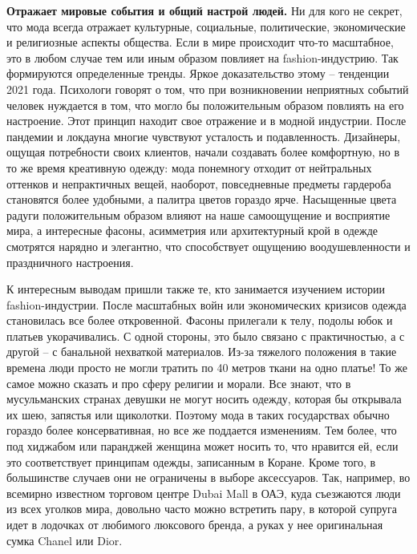 \textbf{Отражает мировые события и общий настрой людей.}
Ни для кого не секрет, что мода всегда отражает культурные, социальные, политические, экономические и религиозные аспекты общества. Если в мире происходит что-то масштабное, это в любом случае тем или иным образом повлияет на fashion-индустрию. Так формируются определенные тренды. Яркое доказательство этому – тенденции 2021 года. Психологи говорят о том, что при возникновении неприятных событий человек нуждается в том, что могло бы положительным образом повлиять на его настроение. Этот принцип находит свое отражение и в модной индустрии. После пандемии и локдауна многие чувствуют усталость и подавленность. Дизайнеры, ощущая потребности своих клиентов, начали создавать более комфортную, но в то же время креативную одежду: мода понемногу отходит от нейтральных оттенков и непрактичных вещей, наоборот, повседневные предметы гардероба становятся более удобными, а палитра цветов гораздо ярче. Насыщенные цвета радуги положительным образом влияют на наше самоощущение и восприятие мира, а интересные фасоны, асимметрия или архитектурный крой в одежде смотрятся нарядно и элегантно, что способствует ощущению воодушевленности и праздничного настроения.

К интересным выводам пришли также те, кто занимается изучением истории fashion-индустрии. После масштабных войн или экономических кризисов одежда становилась все более откровенной. Фасоны прилегали к телу, подолы юбок и платьев укорачивались. С одной стороны, это было связано с практичностью, а с другой – с банальной нехваткой материалов. Из-за тяжелого положения в такие времена люди просто не могли тратить по 40 метров ткани на одно платье!
То же самое можно сказать и про сферу религии и морали. Все знают, что в мусульманских странах девушки не могут носить одежду, которая бы открывала их шею, запястья или щиколотки. Поэтому мода в таких государствах обычно гораздо более консервативная, но все же поддается изменениям. Тем более, что под хиджабом или паранджей женщина может носить то, что нравится ей, если это соответствует принципам одежды, записанным в Коране. Кроме того, в большинстве случаев они не ограничены в выборе аксессуаров. Так, например, во всемирно известном торговом центре Dubai Mall в ОАЭ, куда съезжаются люди из всех уголков мира, довольно часто можно встретить пару, в которой супруга идет в лодочках от любимого люксового бренда, а руках у нее оригинальная сумка Chanel или Dior.

